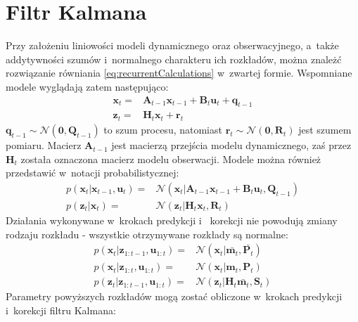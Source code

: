 \section{Filtr Kalmana} \label{KalmanFilter}
Przy założeniu liniowości modeli dynamicznego oraz obserwacyjnego, a~także addytywności szumów i~normalnego charakteru ich rozkładów, można znależć rozwiązanie równiania \ref{eq:recurrentCalculations} w~zwartej formie. Wspomniane modele wyglądają zatem następująco:
\begin{align}\label{eq:KalmanModels}
        \boldsymbol{x}_t = & \boldsymbol{A}_{t-1}\boldsymbol{x}_{t-1}+\boldsymbol{B}_{t}\boldsymbol{u}_{t}+\boldsymbol{q}_{t-1} \nonumber \\
        \boldsymbol{z}_t = & \boldsymbol{H}_{t}\boldsymbol{x}_{t}+\boldsymbol{r}_{t}
\end{align}
$\boldsymbol{q}_{t-1} \sim \mathcal{N}(\boldsymbol{0},\boldsymbol{Q}_{t-1})$ to szum procesu, natomiast $\boldsymbol{r}_{t} \sim \mathcal{N}(\boldsymbol{0},\boldsymbol{R}_{t})$ jest szumem pomiaru. Macierz $\boldsymbol{A}_{t-1}$ jest macierzą przejścia modelu dynamicznego, zaś przez $\boldsymbol{H}_t$ została oznaczona macierz modelu obserwacji. Modele można również przedstawić w~notacji probabilistycznej:
\begin{align}\label{eq:KalmanProbabilisticModels}
p(\boldsymbol{x}_t|\boldsymbol{x}_{t-1},\boldsymbol{u}_t)=&\mathcal{N}(\boldsymbol{x}_t|\boldsymbol{A}_{t-1}\boldsymbol{x}_{t-1}+\boldsymbol{B}_{t}\boldsymbol{u}_{t},\boldsymbol{Q}_{t-1}) \nonumber \\
p(\boldsymbol{z}_t|\boldsymbol{x}_{t})=&\mathcal{N}(\boldsymbol{z}_t|\boldsymbol{H}_{t}\boldsymbol{x}_{t},\boldsymbol{R}_{t})
\end{align}
Działania wykonywane w~krokach predykcji i ~korekcji nie powodują zmiany rodzaju rozkładu - wszystkie otrzymywane rozkłady są normalne:
\begin{align}\label{eq:KalmanDistributions}
p(\boldsymbol{x}_t|\boldsymbol{z}_{1:t-1},\boldsymbol{u}_{1:t})=&\mathcal{N}(\boldsymbol{x}_t|\bar{\boldsymbol{m}_{t}},\bar{\boldsymbol{P}_{t}}) \nonumber \\
p(\boldsymbol{x}_t|\boldsymbol{z}_{1:t},\boldsymbol{u}_{1:t})=&\mathcal{N}(\boldsymbol{x}_t|\boldsymbol{m}_{t},\boldsymbol{P}_{t}) \nonumber \\
p(\boldsymbol{z}_t|\boldsymbol{z}_{1:t-1},\boldsymbol{u}_{1:t})=&\mathcal{N}(\boldsymbol{z}_t|\boldsymbol{H}_t\bar{\boldsymbol{m}_{t}},\boldsymbol{S}_{t})
\end{align}
Parametry powyższych rozkładów mogą zostać obliczone w~krokach predykcji i~korekcji filtru Kalmana:
